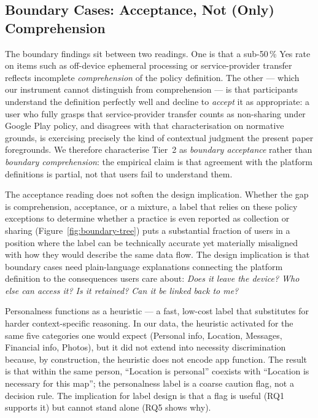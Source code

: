\documentclass[11pt,a4paper]{article}
\begin{document}
\subsection{Boundary Cases: Acceptance, Not (Only) Comprehension}
\label{subsec:boundary-usability}

The boundary findings sit between two readings. One is that a sub-50\,\%
Yes rate on items such as off-device ephemeral processing or
service-provider transfer reflects incomplete \emph{comprehension} of
the policy definition. The other --- which our instrument cannot
distinguish from comprehension --- is that participants understand the
definition perfectly well and decline to \emph{accept} it as
appropriate: a user who fully grasps that service-provider transfer
counts as non-sharing under Google Play policy, and disagrees with
that characterisation on normative grounds, is exercising precisely
the kind of contextual judgment the present paper foregrounds. We
therefore characterise Tier~2 as \emph{boundary acceptance} rather
than \emph{boundary comprehension}: the empirical claim is that
agreement with the platform definitions is partial, not that users
fail to understand them.

The acceptance reading does not soften the design implication. Whether
the gap is comprehension, acceptance, or a mixture, a label that
relies on these policy exceptions to determine whether a practice is
even reported as collection or sharing
(Figure~\ref{fig:boundary-tree}) puts a substantial fraction of users
in a position where the label can be technically accurate yet
materially misaligned with how they would describe the same data
flow. The design implication is that boundary cases need
plain-language explanations connecting the platform definition to the
consequences users care about: \emph{Does it leave the device? Who
else can access it? Is it retained? Can it be linked back to me?}


Personalness functions as a heuristic --- a fast, low-cost label that
substitutes for harder context-specific reasoning. In our data, the
heuristic activated for the same five categories one would expect
(Personal info, Location, Messages, Financial info, Photos), but it
did not extend into necessity discrimination because, by construction,
the heuristic does not encode app function. The result is that within
the same person, ``Location is personal'' coexists with ``Location
is necessary for this map''; the personalness label is a coarse
caution flag, not a decision rule. The implication for label design
is that a flag is useful (RQ1 supports it) but cannot stand alone
(RQ5 shows why).
\end{document}
